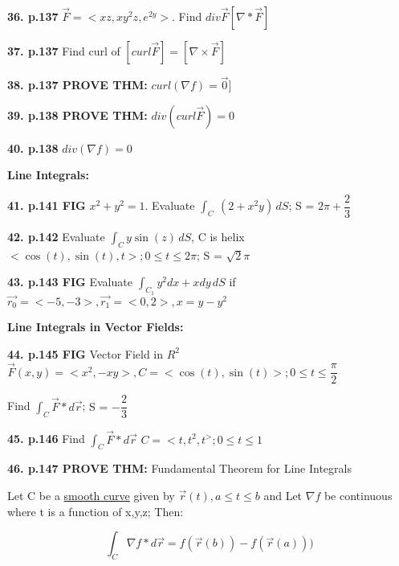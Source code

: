 \documentclass{article}
\begin{document}
\vspace{5mm}
\textbf{36. p.137} \(\Vec{F} = <xz, xy^2z, e^{2y}>\). Find \(div \Vec{F} [\nabla * \Vec{F}]\)

\vspace{5mm}
\textbf{37. p.137} Find curl of \([curl \Vec{F}] = [\nabla \times \Vec{F}]\)

\vspace{5mm}
\textbf{38. p.137 PROVE THM:} \( curl (\nabla f) = \Vec{0} ]\)

\vspace{5mm}
\textbf{39. p.138 PROVE THM:} \( div (curl \Vec{F}) = 0 \)

\vspace{5mm}
\textbf{40. p.138} \( div (\nabla{f}) = 0 \)


\vspace{15mm}
{\Large \textbf{Line Integrals:}}

\vspace{5mm}
\textbf{41. p.141 FIG} \(x^2+y^2=1\). Evaluate $\int_C \ (2+x^2y) \,dS$; {\color{blue}S = $2\pi + \dfrac{2}{3}$}

\vspace{5mm}
\textbf{42. p.142} Evaluate $\int_C y \sin(z) \,dS$, C is helix $<\cos(t),\sin(t),t>; 0 \leq t \leq{2\pi}$; {\color{blue}S = $\sqrt{2}\pi$}

\vspace{5mm}
\textbf{43. p.143 FIG} Evaluate $\int_{C_1} y^2dx+xdy \,dS$ if $\Vec{r_0}=<-5,-3>, \Vec{r_1}=<0,2>, x=y-y^2$

\vspace{15mm}
{\Large \textbf{Line Integrals in Vector Fields:}}

\vspace{5mm}
\textbf{44. p.145 FIG} Vector Field in \(R^2\) $\Vec{F}(x,y)=<x^2,-xy>, C=<\cos(t),\sin(t)>; 0 \leq t \leq{\dfrac{\pi}{2}}$

Find $\int_C \Vec{F}*d\Vec{r}$; {\color{blue}S = $-\dfrac{2}{3}$}

\vspace{5mm}
\textbf{45. p.146} Find $\int_C \Vec{F}*d\Vec{r}$ $C=<t,t^2,t^>; 0 \leq t \leq 1$

\vspace{5mm}
\textbf{46. p.147 PROVE THM:} Fundamental Theorem for Line Integrals

Let C be a \underline{smooth curve} given by $\Vec{r}(t), a\leq t \leq b$ and Let \(\nabla f\) be continuous where t is a function of x,y,z; Then:

$$\int_C \nabla f * d\Vec{r} = f(\Vec{r}(b)) - f(\Vec{r}(a)))$$
\end{document}
